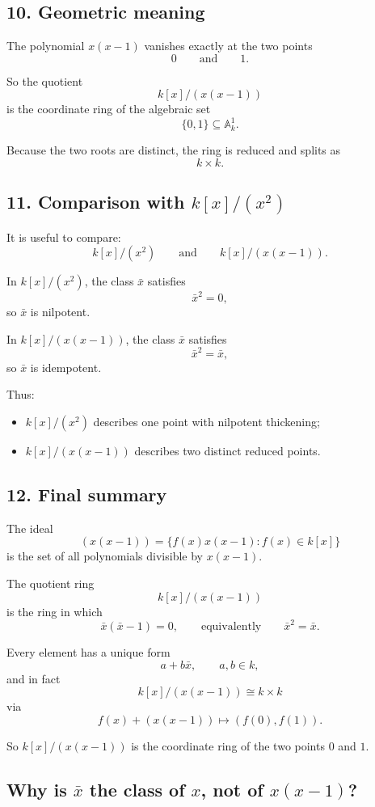 \documentclass[12pt,a4paper]{article}
\theoremstyle{notespace}
\begin{document}
\subsection{10. Geometric meaning}

The polynomial \(x(x-1)\) vanishes exactly at the two points
\[
0
\qquad\text{and}\qquad
1.
\]

So the quotient
\[
k[x]/(x(x-1))
\]
is the coordinate ring of the algebraic set
\[
\{0,1\}\subseteq \mathbb A_k^1.
\]

Because the two roots are distinct, the ring is reduced and splits as
\[
k\times k.
\]

\subsection{11. Comparison with \(k[x]/(x^2)\)}

It is useful to compare:
\[
k[x]/(x^2)
\qquad\text{and}\qquad
k[x]/(x(x-1)).
\]

In \(k[x]/(x^2)\), the class \(\bar x\) satisfies
\[
\bar x^2=0,
\]
so \(\bar x\) is nilpotent.

In \(k[x]/(x(x-1))\), the class \(\bar x\) satisfies
\[
\bar x^2=\bar x,
\]
so \(\bar x\) is idempotent.

Thus:
\begin{itemize}
	\item \(k[x]/(x^2)\) describes one point with nilpotent thickening;
	\item \(k[x]/(x(x-1))\) describes two distinct reduced points.
\end{itemize}

\subsection{12. Final summary}

The ideal
\[
(x(x-1))
=
\{f(x)x(x-1):f(x)\in k[x]\}
\]
is the set of all polynomials divisible by \(x(x-1)\).

The quotient ring
\[
k[x]/(x(x-1))
\]
is the ring in which
\[
\bar x(\bar x-1)=0,
\qquad\text{equivalently}\qquad
\bar x^2=\bar x.
\]

Every element has a unique form
\[
a+b\bar x,
\qquad a,b\in k,
\]
and in fact
\[
k[x]/(x(x-1))\cong k\times k
\]
via
\[
f(x)+(x(x-1))
\longmapsto
(f(0),f(1)).
\]

So \(k[x]/(x(x-1))\) is the coordinate ring of the two points \(0\) and \(1\).

\subsection{Why is \(\bar x\) the class of \(x\), not of \(x(x-1)\)?}
\end{document}
